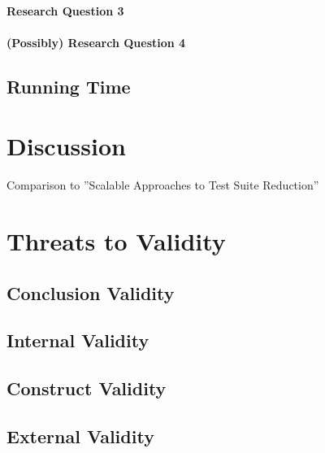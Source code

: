 \paragraph{Research Question 3}

\paragraph{(Possibly) Research Question 4}

\subsection{Running Time}

\section{Discussion}

Comparison to ''Scalable Approaches to Test Suite Reduction''

\section{Threats to Validity}

\subsection{Conclusion Validity}

\subsection{Internal Validity}

\subsection{Construct Validity}

\subsection{External Validity}
